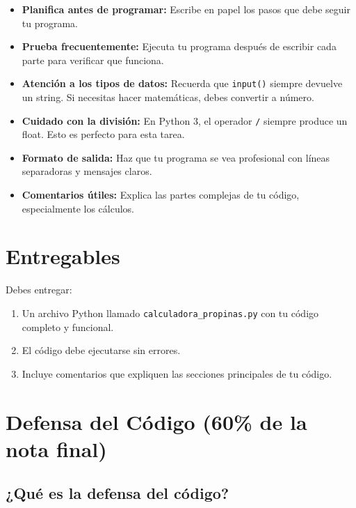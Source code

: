 \documentclass[12pt,a4paper]{article}
\begin{document}
\begin{itemize}[leftmargin=*]
    \item \textbf{Planifica antes de programar:} Escribe en papel los pasos que debe seguir tu programa.
    
    \item \textbf{Prueba frecuentemente:} Ejecuta tu programa después de escribir cada parte para verificar que funciona.
    
    \item \textbf{Atención a los tipos de datos:} Recuerda que \texttt{input()} siempre devuelve un string. Si necesitas hacer matemáticas, debes convertir a número.
    
    \item \textbf{Cuidado con la división:} En Python 3, el operador \texttt{/} siempre produce un float. Esto es perfecto para esta tarea.
    
    \item \textbf{Formato de salida:} Haz que tu programa se vea profesional con líneas separadoras y mensajes claros.
    
    \item \textbf{Comentarios útiles:} Explica las partes complejas de tu código, especialmente los cálculos.
\end{itemize}

\section{Entregables}

Debes entregar:

\begin{enumerate}[leftmargin=*]
    \item Un archivo Python llamado \texttt{calculadora\_propinas.py} con tu código completo y funcional.
    
    \item El código debe ejecutarse sin errores.
    
    \item Incluye comentarios que expliquen las secciones principales de tu código.
\end{enumerate}

\section{Defensa del Código (60\% de la nota final)}

\subsection{¿Qué es la defensa del código?}
\end{document}
